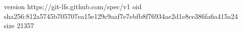 version https://git-lfs.github.com/spec/v1
oid sha256:812a5745b705707ea15e129c9aaf7e7ebfb8f76934ae2d1e8ce386fa6a415a24
size 21357
